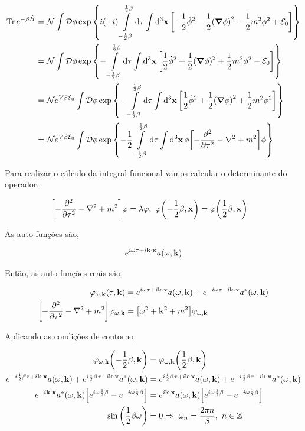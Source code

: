 \documentclass[twoside]{amsart}
\newcommand{\Dd}[1]{\mathcal D #1}
\numberwithin{equation}{section}
\begin{document}
\begin{align}
    \Tr e^{-\beta\hat H}&=\mathcal N\int\Dd{\phi}\exp\qty{i\qty(-i)\int\limits_{-\frac12\beta}^{\frac12\beta}\dd{\tau}\int\dd[3]{\vb x}\qty[-\frac{1}{2}{\dot\phi}^2-\frac12\qty(\grad\phi)^2-\frac12m^2\phi^2+\mathcal E_0]}\\
    &=\mathcal N\int\Dd{\phi}\exp\qty{-\int\limits_{-\frac12\beta}^{\frac12\beta}\dd{\tau}\int\dd[3]{\vb x}\qty[\frac{1}{2}{\dot\phi}^2+\frac12\qty(\grad\phi)^2+\frac12m^2\phi^2-\mathcal E_0]}\\
    &=\mathcal Ne^{V\beta\mathcal E_0}\int\Dd{\phi}\exp\qty{-\int\limits_{-\frac12\beta}^{\frac12\beta}\dd{\tau}\int\dd[3]{\vb x}\qty[\frac{1}{2}{\dot\phi}^2+\frac12\qty(\grad\phi)^2+\frac12m^2\phi^2]}\\
    &=\mathcal Ne^{V\beta\mathcal E_0}\int\Dd{\phi}\exp\qty{-\frac12\int\limits_{-\frac12\beta}^{\frac12\beta}\dd{\tau}\int\dd[3]{\vb x}\phi\qty[-\pdv[2]{}{\tau}-\laplacian+m^2]\phi}
\end{align}

Para realizar o cálculo da integral funcional vamos calcular o determinante do operador,

\begin{align}
    \qty[-\pdv[2]{\tau}-\laplacian+m^2]\varphi&=\lambda\varphi,\ \varphi\qty(-\frac12\beta,\vb x)=\varphi\qty(\frac12\beta,\vb x)
\end{align}

As auto-funções são,

\begin{align}
    e^{i\omega\tau+i\vb k\cdot\vb x}a\qty(\omega,\vb k)
\end{align}

Então, as auto-funções reais são,

\begin{align}
    \varphi_{\omega,\vb k}\qty(\tau,\vb k)&=e^{i\omega\tau+i\vb k\cdot\vb x}a\qty(\omega,\vb k)+e^{-i\omega\tau-i\vb k\cdot\vb x}a^\ast\qty(\omega,\vb k)\\
    \qty[-\pdv[2]{\tau}-\laplacian+m^2]\varphi_{\omega,\vb k}&=\qty[\omega^2+\vb k^2+m^2]\varphi_{\omega,\vb k}
\end{align}

Aplicando as condições de contorno,

\begin{align}
    \varphi_{\omega,\vb k}\qty(-\frac12\beta,\vb k)&=\varphi_{\omega,\vb k}\qty(\frac12\beta,\vb k)\\
    e^{-i\frac12\beta\tau+i\vb k\cdot\vb x}a\qty(\omega,\vb k)+e^{i\frac12\beta\tau-i\vb k\cdot\vb x}a^\ast\qty(\omega,\vb k)&=e^{i\frac12\beta\tau+i\vb k\cdot\vb x}a\qty(\omega,\vb k)+e^{-i\frac12\beta\tau-i\vb k\cdot\vb x}a^\ast\qty(\omega,\vb k)\\
    e^{-i\vb k\cdot\vb x}a^\ast\qty(\omega,\vb k)\qty[e^{i\omega\frac12\beta}-e^{-i\omega\frac12\beta}]&=e^{i\vb k\cdot\vb x}a\qty(\omega,\vb k)\qty[e^{i\omega\frac12\beta}-e^{-i\omega\frac12\beta}]\\
    \sin\qty(\frac12\beta\omega)&=0\Rightarrow\ \omega_n=\frac{2\pi n}{\beta},\ n\in\mathbb Z
\end{align}
\end{document}
